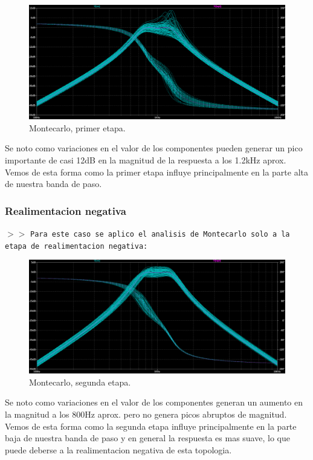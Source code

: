 \begin{figure}[H]
    \centering
    \includegraphics[scale=.3]{Secciones/Circ1/img/mtcarloPosVar.png}
    \caption{Montecarlo, primer etapa.}
    \label{prop}
\end{figure}

Se noto como variaciones en el valor de los componentes pueden generar un pico importante de casi 12dB en la magnitud de la respuesta a los 1.2kHz aprox. Vemos de esta forma como la primer etapa influye principalmente en la parte alta de nuestra banda de paso.

\subsubsection{Realimentacion negativa}

\noindent $>>$ \texttt{Para este caso se aplico el analisis de Montecarlo solo a la etapa de realimentacion negativa:}

\begin{figure}[H]
    \centering
    \includegraphics[scale=.3]{Secciones/Circ1/img/mtcarloNegVar.png}
    \caption{Montecarlo, segunda etapa.}
    \label{prop}
\end{figure}

Se noto como variaciones en el valor de los componentes generan un aumento en la magnitud a los 800Hz aprox. pero no genera picos abruptos de magnitud. Vemos de esta forma como la segunda etapa influye principalmente en la parte baja de nuestra banda de paso y en general la respuesta es mas suave, lo que puede deberse a la realimentacion negativa de esta topologia.

